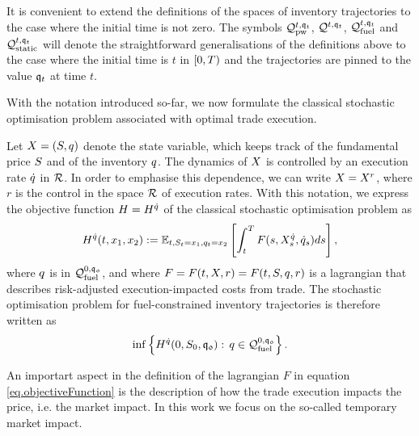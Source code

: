 \documentclass[10pt,a4paper]{article}
\begin{document}
It is convenient to extend the definitions of the spaces of inventory trajectories to the case where the initial time is not zero. The symbols $\mathcal{Q}_{\text{pw}}^{t,\mathfrak{q}_t}$, $\mathcal{Q}^{t,\mathfrak{q}_t}$, $\mathcal{Q}_{\text{fuel}}^{t,\mathfrak{q}_t}$ and $\mathcal{Q}_{\text{static}}^{t,\mathfrak{q}_t}$ will denote the straightforward generalisations of the definitions above to the case where the initial time is $t$ in $[0,T)$ and the trajectories are pinned to the value $\mathfrak{q}_t$ at time $t$. 

With the notation introduced so-far, we now formulate the classical stochastic optimisation problem associated with optimal trade execution. 

Let $X = (S,q)$ denote the state variable, which keeps track of the fundamental price $S$ and of the inventory $q$. The dynamics of $X$ is controlled by an execution rate $\dot{q}$ in $\mathcal{R}$. In order to emphasise this dependence, we can write $X=X^{r}$, where $r$ is the control in the space $\mathcal{R}$ of execution rates. With this notation, we express the objective function $H=H^{\dot{q}}$ of the classical stochastic optimisation problem as 
\begin{equation}\label{eq.objectiveFunction}
H^{\dot{q}} (t,x_1,x_2) :=
\mathbb{{E}}_{t,S_t=x_1, q_t=x_2}
\left[
\int_{t}^{T} F(s,X^{\dot{q}}_s,\dot{q}_s) ds
\right],
\end{equation}
where $q$ is in $\mathcal{Q}_{\text{fuel}}^{0,\mathfrak{q_0}}$, and where $F=F(t,X,r)=F(t,S,q,r)$ is a lagrangian that describes risk-adjusted execution-impacted costs from trade. The stochastic optimisation problem for fuel-constrained inventory trajectories is therefore written as 
\begin{equation}\label{eq.fuelConstrainedStochOptProblem}
\inf \left\lbrace H^{\dot{q}} (0,S_0,\mathfrak{q_0}): \, q \in \mathcal{Q}_{\text{fuel}}^{0,\mathfrak{q_0}} \right\rbrace . 
\end{equation}

An importart aspect in the definition of the lagrangian $F$ in equation \eqref{eq.objectiveFunction} is the description of how the trade execution impacts the price, i.e. the market impact. In this work we focus on the so-called temporary market impact.    
\end{document}
